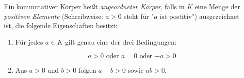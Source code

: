 Ein kommutativer Körper heißt \textit{angeordneter Körper}, falls in $K$ eine Menge der \textit{positiven Elemente} (Schreibweise: $a > 0$ steht für "$a$ ist postitiv") ausgezeichnet ist, die folgende Eigenschaften besitzt:

\begin{enumerate}

\item Für jedes $a \in K$ gilt genau eine der drei Bedingungen:

$$\text{$a > 0$ oder $a = 0$ oder $-a > 0$}$$

\item Aus $a > 0$ und $b > 0$ folgen $a+b > 0$ sowie $ab > 0$.

\end{enumerate}
